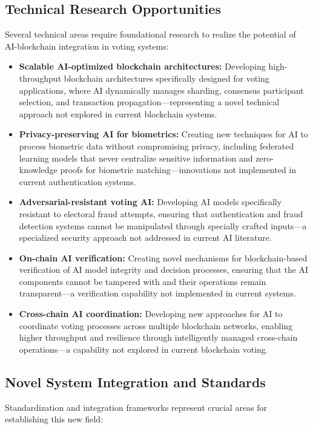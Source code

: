 \documentclass[conference]{IEEEtran}
\begin{document}
\subsection{Technical Research Opportunities}
Several technical areas require foundational research to realize the potential of AI-blockchain integration in voting systems:

\begin{itemize}
    \item \textbf{Scalable AI-optimized blockchain architectures:} Developing high-throughput blockchain architectures specifically designed for voting applications, where AI dynamically manages sharding, consensus participant selection, and transaction propagation—representing a novel technical approach not explored in current blockchain systems.
    
    \item \textbf{Privacy-preserving AI for biometrics:} Creating new techniques for AI to process biometric data without compromising privacy, including federated learning models that never centralize sensitive information and zero-knowledge proofs for biometric matching—innovations not implemented in current authentication systems.
    
    \item \textbf{Adversarial-resistant voting AI:} Developing AI models specifically resistant to electoral fraud attempts, ensuring that authentication and fraud detection systems cannot be manipulated through specially crafted inputs—a specialized security approach not addressed in current AI literature.
    
    \item \textbf{On-chain AI verification:} Creating novel mechanisms for blockchain-based verification of AI model integrity and decision processes, ensuring that the AI components cannot be tampered with and their operations remain transparent—a verification capability not implemented in current systems.
    
    \item \textbf{Cross-chain AI coordination:} Developing new approaches for AI to coordinate voting processes across multiple blockchain networks, enabling higher throughput and resilience through intelligently managed cross-chain operations—a capability not explored in current blockchain voting.
\end{itemize}

\subsection{Novel System Integration and Standards}
Standardization and integration frameworks represent crucial areas for establishing this new field:
\end{document}
